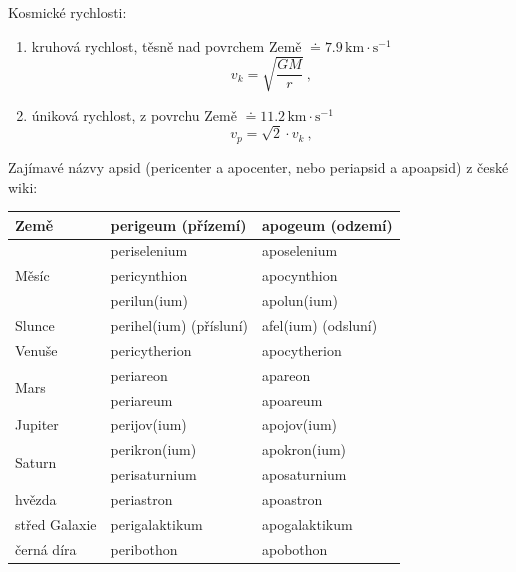 \documentclass{article}
\begin{document}
Kosmické rychlosti:
\begin{enumerate}
    \item kruhová rychlost, těsně nad povrchem Země $\doteq 7.9\,\mathrm{km}\cdot\mathrm{s}^{-1}$
        \begin{equation}
            v_k = \sqrt{\frac{GM}{r}} ~,
        \end{equation}
    \item úniková rychlost, z povrchu Země $\doteq 11.2\,\mathrm{km}\cdot\mathrm{s}^{-1}$
        \begin{equation}
            v_p = \sqrt{2}\cdot v_k ~,
        \end{equation}
\end{enumerate}

Zajímavé názvy apsid (pericenter a apocenter, nebo periapsid a apoapsid) z české wiki:\\
\begin{tabular}{lll}
Země                               & perigeum (přízemí)      & apogeum (odzemí) \\
\hline
\multirow{3}{.2\linewidth}{Měsíc}  & periselenium            & aposelenium \\
                                   & pericynthion            & apocynthion \\
                                   & perilun(ium)            & apolun(ium) \\
\hline
Slunce                             & perihel(ium) (přísluní) & afel(ium) (odsluní) \\
\hline
Venuše                             & pericytherion           & apocytherion \\
\hline
\multirow{2}{.2\linewidth}{Mars}   & periareon               & apareon \\
                                   & periareum               & apoareum \\
\hline
Jupiter                            & perijov(ium)            & apojov(ium) \\
\hline
\multirow{2}{.2\linewidth}{Saturn} & perikron(ium)           & apokron(ium) \\
                                   & perisaturnium           & aposaturnium \\
\hline
hvězda                             & periastron              & apoastron \\
\hline
střed Galaxie                      & perigalaktikum          & apogalaktikum \\
\hline
černá díra                         & peribothon              & apobothon
\end{tabular}
\end{document}
